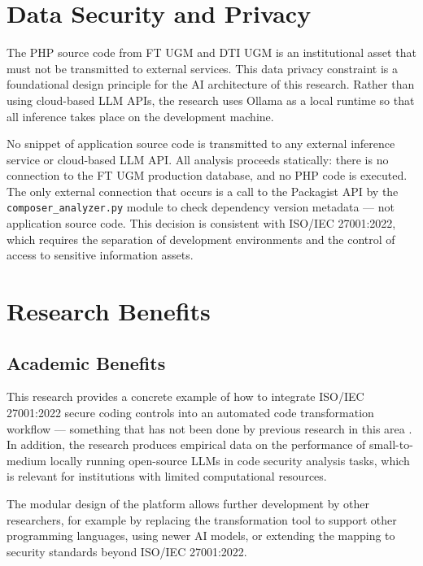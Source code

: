 \section{Data Security and Privacy}
\label{sec:data-privacy}

The PHP source code from FT UGM and DTI UGM is an institutional asset that must not be transmitted to external services. This data privacy constraint is a foundational design principle for the AI architecture of this research. Rather than using cloud-based LLM APIs, the research uses Ollama as a local runtime so that all inference takes place on the development machine.

No snippet of application source code is transmitted to any external inference service or cloud-based LLM API. All analysis proceeds statically: there is no connection to the FT UGM production database, and no PHP code is executed. The only external connection that occurs is a call to the Packagist API by the \texttt{composer\_analyzer.py} module to check dependency version metadata — not application source code. This decision is consistent with ISO/IEC 27001:2022, which requires the separation of development environments and the control of access to sensitive information assets.

\section{Research Benefits}

\subsection{Academic Benefits}

This research provides a concrete example of how to integrate ISO/IEC 27001:2022 secure coding controls into an automated code transformation workflow \cite{iso27001_2022} — something that has not been done by previous research in this area \cite{merlo2007automated}\cite{akuthota2023vulnerability}\cite{stumpfle2025llm}. In addition, the research produces empirical data on the performance of small-to-medium locally running open-source LLMs in code security analysis tasks, which is relevant for institutions with limited computational resources.

The modular design of the platform allows further development by other researchers, for example by replacing the transformation tool to support other programming languages, using newer AI models, or extending the mapping to security standards beyond ISO/IEC 27001:2022.

